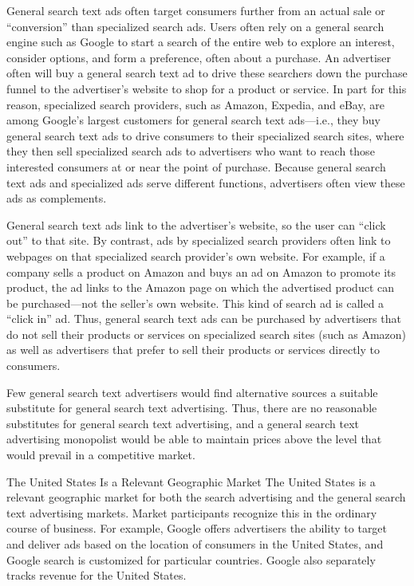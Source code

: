 \documentclass[11pt,b5paper]{scrartcl}
\begin{document}
General search text ads often target consumers further from an actual sale or
“conversion” than specialized search ads. Users often rely on a general search engine such as
Google to start a search of the entire web to explore an interest, consider options, and form a
preference, often about a purchase. An advertiser often will buy a general search text ad to drive
these searchers down the purchase funnel to the advertiser’s website to shop for a product or
service. In part for this reason, specialized search providers, such as Amazon, Expedia, and
eBay, are among Google’s largest customers for general search text ads—i.e., they buy general
search text ads to drive consumers to their specialized search sites, where they then sell
specialized search ads to advertisers who want to reach those interested consumers at or near the
point of purchase. Because general search text ads and specialized ads serve different functions,
advertisers often view these ads as complements.


General search text ads link to the advertiser’s website, so the user can “click out”
to that site. By contrast, ads by specialized search providers often link to webpages on that
specialized search provider’s own website. For example, if a company sells a product on
Amazon and buys an ad on Amazon to promote its product, the ad links to the Amazon page on
which the advertised product can be purchased—not the seller’s own website. This kind of
search ad is called a “click in” ad. Thus, general search text ads can be purchased by advertisers
that do not sell their products or services on specialized search sites (such as Amazon) as well as
advertisers that prefer to sell their products or services directly to consumers.


Few general search text advertisers would find alternative sources a suitable
substitute for general search text advertising. Thus, there are no reasonable substitutes for
general search text advertising, and a general search text advertising monopolist would be able to
maintain prices above the level that would prevail in a competitive market.




The United States Is a Relevant Geographic Market
The United States is a relevant geographic market for both the search advertising
and the general search text advertising markets. Market participants recognize this in the
ordinary course of business. For example, Google offers advertisers the ability to target and
deliver ads based on the location of consumers in the United States, and Google search is
customized for particular countries. Google also separately tracks revenue for the United States.
\end{document}
